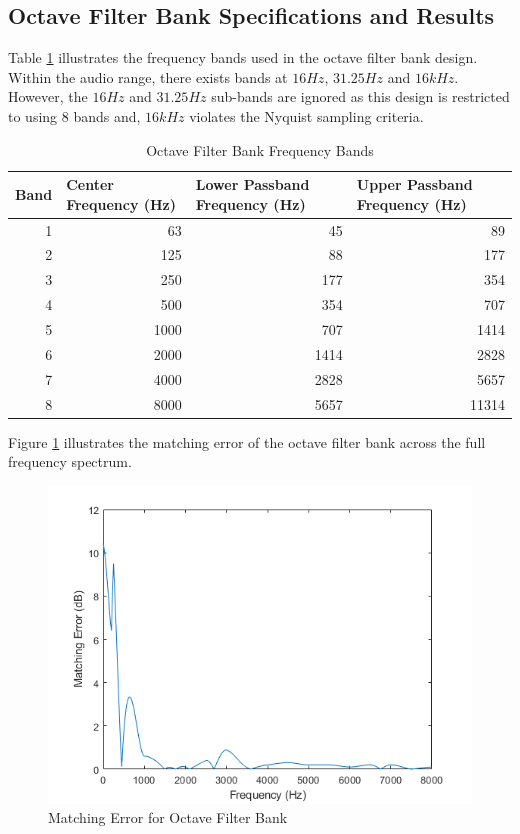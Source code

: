\documentclass[11pt,onecolumn]{witseiepaper}
\begin{document}
\begin{appendices}
\section{Octave Filter Bank Specifications and Results}
\label{app:octFreqBands}

\noindent Table \ref{tab:octFreqBands} illustrates the frequency bands used in the octave filter bank design. Within the audio range, there exists bands at $16Hz$, $31.25Hz$ and $16kHz$. However, the $16Hz$ and $31.25Hz$ sub-bands are ignored as this design is restricted to using $8$ bands and, $16kHz$ violates the Nyquist sampling criteria.

\begin{table}[htbp]
  \centering
  \caption{Octave Filter Bank Frequency Bands}
  \begin{adjustbox}{width=\linewidth}
    \begin{tabular}{|r|r|r|r|}
    \hline
    \multicolumn{1}{|l|}{\textbf{Band}} & \multicolumn{1}{l|}{\textbf{Center Frequency (Hz)}} & \multicolumn{1}{l|}{\textbf{Lower Passband Frequency (Hz)}} & \multicolumn{1}{l|}{\textbf{Upper Passband Frequency (Hz)}} \\
    \hline
    1     & 63    & 45    & 89 \\
    \hline
    2     & 125   & 88    & 177 \\
    \hline
    3     & 250   & 177   & 354 \\
    \hline
    4     & 500   & 354   & 707 \\
    \hline
    5     & 1000  & 707   & 1414 \\
    \hline
    6     & 2000  & 1414  & 2828 \\
    \hline
    7     & 4000  & 2828  & 5657 \\
    \hline
    8     & 8000  & 5657  & 11314 \\
    \hline
    \end{tabular}%
    \end{adjustbox}
  \label{tab:octFreqBands}%
\end{table}%

\noindent Figure \ref{fig:octMatErr} illustrates the matching error of the octave filter bank across the full frequency spectrum.

\begin{figure}[h]
\centering
\includegraphics[width=0.6\linewidth]{octMatErr.PNG}
\caption{Matching Error for Octave Filter Bank}
\label{fig:octMatErr}
\end{figure}  



\end{appendices}
\end{document}
